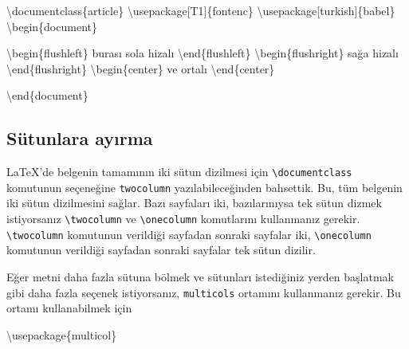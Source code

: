 \documentclass[
  letterpaper,
  DIV=11,
  numbers=noendperiod]{scrreprt}
\newenvironment{Shaded}{\begin{snugshade}}{\end{snugshade}}
\newcommand{\BuiltInTok}[1]{\textcolor[rgb]{0.00,0.23,0.31}{#1}}
\newcommand{\ExtensionTok}[1]{\textcolor[rgb]{0.00,0.23,0.31}{#1}}
\newcommand{\KeywordTok}[1]{\textcolor[rgb]{0.00,0.23,0.31}{#1}}
\newcommand{\NormalTok}[1]{\textcolor[rgb]{0.00,0.23,0.31}{#1}}
\begin{document}
\begin{Shaded}
\begin{Highlighting}[]
\BuiltInTok{\textbackslash{}documentclass}\NormalTok{\{}\ExtensionTok{article}\NormalTok{\}}
\BuiltInTok{\textbackslash{}usepackage}\NormalTok{[T1]\{}\ExtensionTok{fontenc}\NormalTok{\}}
\BuiltInTok{\textbackslash{}usepackage}\NormalTok{[turkish]\{}\ExtensionTok{babel}\NormalTok{\}}
\KeywordTok{\textbackslash{}begin}\NormalTok{\{}\ExtensionTok{document}\NormalTok{\}}

\KeywordTok{\textbackslash{}begin}\NormalTok{\{}\ExtensionTok{flushleft}\NormalTok{\}}
\NormalTok{ burası sola hizalı}
\KeywordTok{\textbackslash{}end}\NormalTok{\{}\ExtensionTok{flushleft}\NormalTok{\}}
\KeywordTok{\textbackslash{}begin}\NormalTok{\{}\ExtensionTok{flushright}\NormalTok{\}}
\NormalTok{ sağa hizalı}
\KeywordTok{\textbackslash{}end}\NormalTok{\{}\ExtensionTok{flushright}\NormalTok{\}}
\KeywordTok{\textbackslash{}begin}\NormalTok{\{}\ExtensionTok{center}\NormalTok{\}}
\NormalTok{ ve ortalı}
\KeywordTok{\textbackslash{}end}\NormalTok{\{}\ExtensionTok{center}\NormalTok{\}}


\KeywordTok{\textbackslash{}end}\NormalTok{\{}\ExtensionTok{document}\NormalTok{\}}
\end{Highlighting}
\end{Shaded}

\hypertarget{suxfctunlara-ayux131rma}{%
\subsection{Sütunlara ayırma}\label{suxfctunlara-ayux131rma}}

{\LaTeX}'de belgenin tamamının iki sütun dizilmesi için
\texttt{\textbackslash{}documentclass} komutunun seçeneğine
\texttt{twocolumn} yazılabileceğinden bahsettik. Bu, tüm belgenin iki
sütun dizilmesini sağlar. Bazı sayfaları iki, bazılarınıysa tek sütun
dizmek istiyorsanız \texttt{\textbackslash{}twocolumn} ve
\texttt{\textbackslash{}onecolumn} komutlarını kullanmanız gerekir.
\texttt{\textbackslash{}twocolumn} komutunun verildiği sayfadan sonraki
sayfalar iki, \texttt{\textbackslash{}onecolumn} komutunun verildiği
sayfadan sonraki sayfalar tek sütun dizilir.

Eğer metni daha fazla sütuna bölmek ve sütunları istediğiniz yerden
başlatmak gibi daha fazla seçenek istiyorsanız, \texttt{multicols}
ortamını kullanmanız gerekir. Bu ortamı kullanabilmek için

\begin{Shaded}
\begin{Highlighting}[]
\BuiltInTok{\textbackslash{}usepackage}\NormalTok{\{}\ExtensionTok{multicol}\NormalTok{\}}
\end{Highlighting}
\end{Shaded}
\end{document}
